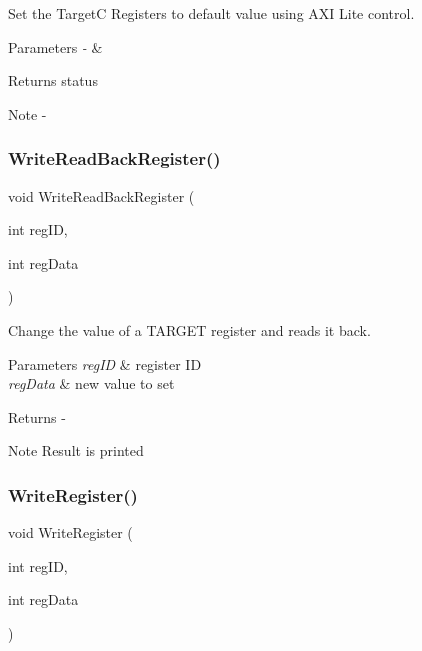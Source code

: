Set the TargetC Registers to default value using A\+XI Lite control. 



 
\begin{DoxyParams}{Parameters}
{\em -\/} & \\
\hline
\end{DoxyParams}
\begin{DoxyReturn}{Returns}
status
\end{DoxyReturn}
\begin{DoxyNote}{Note}
-\/ \begin{DoxyVerb}\end{DoxyVerb}
 
\end{DoxyNote}
\mbox{\label{_t_a_r_g_e_t_c___register_map_8c_adae92300a2b891ea8cc718bf2904ca74}} 
\subsubsection{WriteReadBackRegister()}
{\footnotesize\ttfamily void Write\+Read\+Back\+Register (\begin{DoxyParamCaption}\item[{int}]{reg\+ID,  }\item[{int}]{reg\+Data }\end{DoxyParamCaption})}



Change the value of a T\+A\+R\+G\+ET register and reads it back. 


\begin{DoxyParams}{Parameters}
{\em reg\+ID} & register ID \\
\hline
{\em reg\+Data} & new value to set\\
\hline
\end{DoxyParams}
\begin{DoxyReturn}{Returns}
-\/
\end{DoxyReturn}
\begin{DoxyNote}{Note}
Result is printed 
\end{DoxyNote}
\mbox{\label{_t_a_r_g_e_t_c___register_map_8c_a0171687cfd99ad3e2d9b00bdacd88d36}} 
\subsubsection{WriteRegister()}
{\footnotesize\ttfamily void Write\+Register (\begin{DoxyParamCaption}\item[{int}]{reg\+ID,  }\item[{int}]{reg\+Data }\end{DoxyParamCaption})}




